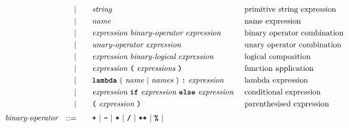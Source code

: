 \begin{alignat*}{9}
&&                       && |   &\quad &&  \textit{string}   && \textrm{primitive string expression}\\
&&                       && |   &\quad &&  \textit{name}   && \textrm{name expression}\\
&&                       && |   &\quad &&  \textit{expression} \  \textit{binary-operator} \ 
                                            \textit{expression} \qquad
                                                           && \textrm{binary operator combination}\\
&&                       && |   &\quad &&   \textit{unary-operator} \ 
                                            \textit{expression}
                                                           && \textrm{unary operator combination}\\
&&                       && |   &\quad &&  \textit{expression} \  \textit{binary-logical} \ 
                                            \textit{expression} \qquad
                                                           && \textrm{logical composition}\\
&&                       && |   &\quad &&   \textit{expression}\ \textbf{\texttt{(}}\ \textit{expressions}\ \textbf{\texttt{)}}
                                                           && \textrm{function application}\\
&&                       && |   &\quad &&   \textbf{\texttt{lambda}}\ (\ \textit{name}\ | \ \textit{names}\ )\    
                                            \texttt{\textbf{:}}\ \textit{expression}
                                                           && \textrm{lambda expression}\\
&&                       && |   &\quad &&   \textit{expression} \ \textbf{\texttt{if}}\ 
                                            \textit{expression}
                                            \ \textbf{\texttt{else}}\
                                            \textit{expression}\
                                                           && \textrm{conditional expression}\\
&&                       && |   &\quad &&  \textbf{\texttt{(}}\  \textit{expression} \ 
                                            \textbf{\texttt{)}} && \textrm{parenthesised expression}\\[1mm]
&& \textit{binary-operator}   
                        && ::= &\quad && \textbf{\texttt{+}}\ |\ \textbf{\texttt{-}}\ |\ \textbf{\texttt{*}}\ |\ \textbf{\texttt{/}}\ |\ \textbf{\texttt{**}}\ |\ \textbf{\texttt{\%}}\ | \\ 

\end{alignat*}

